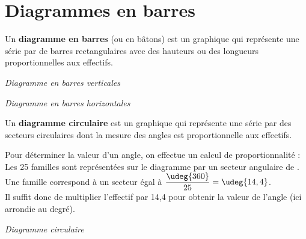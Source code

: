 \section{Diagrammes en barres}

\begin{definition}
   Un \textbf{diagramme en barres} (ou en bâtons) est un graphique qui représente une série par de barres rectangulaires avec des hauteurs ou des longueurs proportionnelles aux effectifs.
\end{definition}

\bigskip

\begin{minipage}{8cm}
   {\it Diagramme en barres verticales}
\end{minipage}
\begin{minipage}{8cm}
   {\it Diagramme en barres horizontales}
\end{minipage}


\begin{definition}
   Un \textbf{diagramme circulaire} est un graphique qui représente une série par des secteurs circulaires dont la mesure des angles est proportionnelle aux effectifs.
\end{definition}
   
\bigskip
   
\begin{minipage}{8.6cm}
   Pour déterminer la valeur d'un angle, on effectue un calcul de proportionnalité : \\
   Les 25 familles sont représentées sur le diagramme par un secteur angulaire de . \\
   Une famille correspond à un secteur égal à $\dfrac{\udeg{360}}{25} =\udeg{14,4}$. \\
   Il suffit donc de multiplier l'effectif par 14,4 pour obtenir la valeur de l'angle (ici arrondie au degré). \\ [2mm]
\end{minipage}
\qquad
\begin{minipage}{7cm}
   {\it Diagramme circulaire} \\ [5mm]
\end{minipage}



